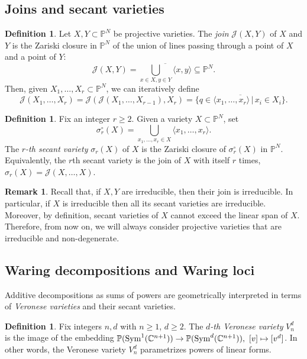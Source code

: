 \documentclass{amsart}
\numberwithin{theorem}{section}
\theoremstyle{definition}
\newtheorem{definition}[theorem]{Definition}
\newtheorem{remark}[theorem]{Remark}
\newcommand{\PP}{\mathbb{P}}
\newcommand{\CC}{\mathbb{C}}
\newcommand{\sym}{\mathop{\rm Sym}\nolimits}
\begin{document}
\subsection{Joins and secant varieties}

\begin{definition}
    Let $X,Y\subset \PP^N$ be projective varieties. The \emph{join} $\mathcal{J}(X,Y)$ of $X$ and $Y$ is the Zariski closure in $\PP^N$ of the union of lines passing through a point of $X$ and a point of $Y$:
    \[
        \mathcal{J}(X,Y)=\overline{\bigcup_{x\in X,y\in Y} \langle x,y \rangle }\subseteq \PP^N.
    \]
    Then, given $X_1,\dots,X_r\subset \PP^N$, we can iteratively define
    \[
        \mathcal{J}(X_1,\dots,X_r)=\mathcal{J}(\mathcal{J}(X_1,\ldots,X_{r-1}),X_r)=\overline{ \{q\in \langle x_1,\dots,x_r \rangle \,|\,  x_i\in X_i\} }.
    \]
\end{definition}



\begin{definition}
    Fix an integer $r\geq 2$. Given a variety $X\subset \PP^N$, set    
    \[
        \sigma_r^\circ(X)=\bigcup_{x_1,\dots,x_r\in X} \langle x_1,\dots,x_r\rangle.
    \]
    The \emph{$r$-th secant variety} $\sigma_r(X)$ of $X$ is the Zariski closure of $\sigma^\circ_r(X)$ in $\PP^N$. Equivalently, the $r$th secant variety is the join of $X$ with itself $r$ times, $\sigma_r(X) = \mathcal{J}(X,\ldots,X)$.
\end{definition}

\begin{remark}
    Recall that, if $X,Y$ are irreducible, then their join is irreducible. In particular, if $X$ is irreducible then all its secant varieties are irreducible. Moreover, by definition, secant varieties of $X$ cannot exceed the linear span of $X$. Therefore, from now on, we will always consider projective varieties that are irreducible and non-degenerate. 
\end{remark}

\subsection{Waring decompositions and Waring loci}
Additive decompositions as sums of powers are geometrically interpreted in terms of \emph{Veronese varieties} and their secant varieties.

\begin{definition}
    Fix integers $n,d$ with $n\geq 1$, $d\geq 2$. The \emph{$d$-th Veronese variety} $V^d_n$ is the image of the embedding $\PP(\sym^1(\CC^{n+1}))\rightarrow \PP(\sym^d(\CC^{n+1})),\ [v]\mapsto [v^d]$. 
    In other words, the Veronese variety $V_n^d$ parametrizes powers of linear forms. 
\end{definition}
\end{document}
